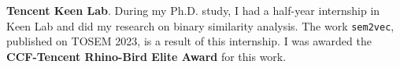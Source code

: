 
\smallskip
\textbf{Tencent Keen Lab}.
During my Ph.D. study, I had a half-year internship in Keen Lab and did my
research on binary similarity analysis. The work \texttt{sem2vec}, published
on TOSEM 2023, is a result of this internship.
I was awarded the \textbf{CCF-Tencent Rhino-Bird Elite Award} for this work.

